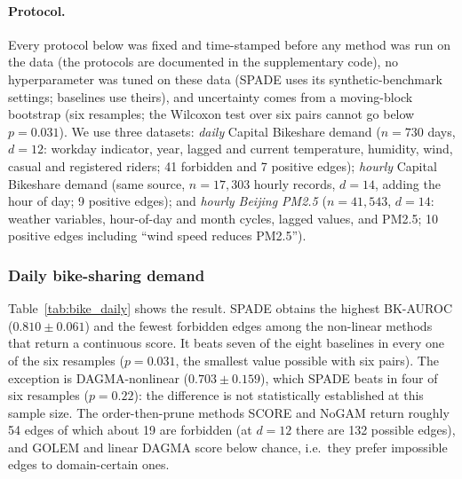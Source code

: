\paragraph{Protocol.} Every protocol below was fixed and time-stamped before any
method was run on the data (the protocols are documented in the supplementary
code), no hyperparameter was tuned on these data
(SPADE uses its synthetic-benchmark settings; baselines use theirs), and
uncertainty comes from a moving-block bootstrap (six resamples; the Wilcoxon
test over six pairs cannot go below $p=0.031$). We use three datasets:
\emph{daily} Capital Bikeshare demand \citep{FanaeeT2014} ($n{=}730$ days,
$d{=}12$: workday indicator, year, lagged and current temperature, humidity, wind,
casual and registered riders; 41 forbidden and 7 positive edges);
\emph{hourly} Capital Bikeshare demand (same source, $n{=}17{,}303$ hourly
records, $d{=}14$, adding the hour of day; 9 positive edges); and \emph{hourly Beijing
PM2.5} \citep{Liang2015} ($n{=}41{,}543$, $d{=}14$: weather variables,
hour-of-day and month cycles, lagged values, and PM2.5; 10 positive edges
including ``wind speed reduces PM2.5'').

\subsubsection{Daily bike-sharing demand}
Table~\ref{tab:bike_daily} shows the result. SPADE obtains the highest BK-AUROC
($0.810\pm0.061$) and the fewest forbidden edges among the non-linear methods
that return a continuous score. It beats seven of the eight baselines in every
one of the six resamples ($p=0.031$, the smallest value possible with six pairs).
The exception is DAGMA-nonlinear ($0.703\pm0.159$), which SPADE beats in four of six
resamples ($p=0.22$): the difference is not statistically established at this
sample size. The order-then-prune methods SCORE and NoGAM return roughly 54 edges
of which about 19 are forbidden (at $d{=}12$ there are 132 possible edges), and
GOLEM and linear DAGMA score below chance, i.e.\ they prefer impossible edges to
domain-certain ones.

\begin{table}[t]
\centering
\caption{Daily bike-sharing demand ($n{=}730$, $d{=}12$): background-knowledge
AUROC (mean$\pm$std over six block-bootstrap resamples; resample~0 is the
original data), forbidden edges among each method's top-12 edges (all edges for
the binary-output SCORE and NoGAM), domain-certain edges recovered, run time, and
paired Wilcoxon $p$ for SPADE versus each method.}
\label{tab:bike_daily}
\end{table}

